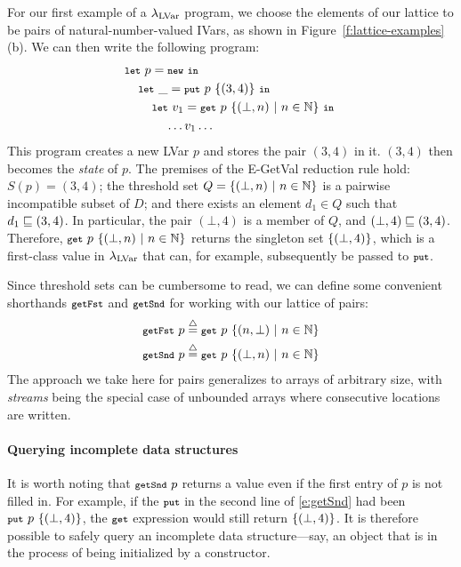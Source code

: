 For our first example of a $\textup{\ensuremath{\lambda_{\textrm{LVar}}}}$ program, we choose the elements of our lattice to be
pairs of natural-number-valued IVars, as shown in 
Figure~\ref{f:lattice-examples}(b).
We can then write the following
program:
\begin{equation}
\begin{split}
& \letexp{p}{\NEW}{ \\
& \letspace \letexp{\_}{\putexp{p}{\stateset{(3,4)}}}{ \\
& \letspace \letspace \letexp{v_1}{\getexp{p}{\stateset{(\bot, n) \setsep n \in \mathbb{N}}}}{ \\
& \letspace \letspace \letspace \dots v_1 \dots}}}
\end{split}
\label{e:getSnd}
\end{equation}
This program creates a new LVar $p$ and stores the pair $(3, 4)$ in
it.  $(3,4)$ then becomes the {\em state} of $p$.  The premises of the
{\sc E-GetVal} reduction rule hold: $S(p) = (3,4)$; the threshold set $Q =
\lbrace (\bot, n) \ | \  n \in \mathbb{N} \rbrace$ is a 
pairwise incompatible subset of $D$; and there exists an element $d_1 \in Q$
such that $d_1 \sqsubseteq (3,4)$.  In
particular, the pair $(\bot, 4)$ is a member of $Q$, and $(\bot,4)
\sqsubseteq (3,4)$.  Therefore,
$\mbox{\footnotesize \texttt{get}}~p~\lbrace (\bot, n) \ | \  n \in \mathbb{N} \rbrace$ returns
the singleton set $\lbrace (\bot,4) \rbrace$,
{which is a first-class value in $\textup{\ensuremath{\lambda_{\textrm{LVar}}}}$ that can, for example, subsequently be passed to $\mbox{\footnotesize \texttt{put}}$.}

Since threshold sets can be cumbersome to read, we can define some
convenient shorthands $\mbox{\footnotesize \texttt{getFst}}$ and $\mbox{\footnotesize \texttt{getSnd}}$ for working with our
lattice of pairs:
\begin{align*}
\mbox{\footnotesize \texttt{getFst}}~p \stackrel{\triangle}{=} \mbox{\footnotesize \texttt{get}}~p~\lbrace (n, \bot) \ | \  n \in
    \mathbb{N} \rbrace \\
\mbox{\footnotesize \texttt{getSnd}}~p \stackrel{\triangle}{=} \mbox{\footnotesize \texttt{get}}~p~\lbrace (\bot, n) \ | \  n \in
    \mathbb{N} \rbrace
\end{align*}
The approach we take here for pairs generalizes to arrays of arbitrary
size, with {\em streams} being the special case of unbounded arrays
where consecutive locations are written.

\paragraph{Querying incomplete data structures}
It is worth noting that $\mbox{\footnotesize \texttt{getSnd}}~p$ returns a value even if the
first entry of $p$ is not filled in.  For example, if the $\mbox{\footnotesize \texttt{put}}$ in
the second line of \eqref{e:getSnd} had been
$\mbox{\footnotesize \texttt{put}}~p~\lbrace (\bot,4) \rbrace$, the $\mbox{\footnotesize \texttt{get}}$ expression would still
return $\lbrace (\bot,4) \rbrace$.  It is therefore possible to safely
query an incomplete data structure---say, an object that is in the
process of being initialized by a constructor.  

